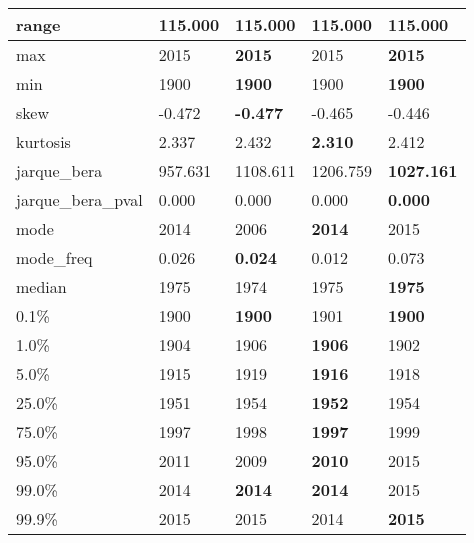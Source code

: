 \begin{table}[H]
\begin{tabular}{|l|m{10em}|m{10em}|m{10em}|m{10em}|}
\hline range & 115.000 & 115.000 & 115.000 & 115.000 \\
\hline max & 2015 & \bfseries 2015 & \cellcolor[rgb]{0.9, 0.54, 0.52} 2015 & \bfseries 2015 \\
\hline min & 1900 & \bfseries 1900 & \cellcolor[rgb]{0.9, 0.54, 0.52} 1900 & \bfseries 1900 \\
\hline skew & -0.472 & \bfseries -0.477 & -0.465 & \cellcolor[rgb]{0.9, 0.54, 0.52} -0.446 \\
\hline kurtosis & 2.337 & \cellcolor[rgb]{0.9, 0.54, 0.52} 2.432 & \bfseries 2.310 & 2.412 \\
\hline jarque\_bera & 957.631 & 1108.611 & \cellcolor[rgb]{0.9, 0.54, 0.52} 1206.759 & \bfseries 1027.161 \\
\hline jarque\_bera\_pval & 0.000 & \cellcolor[rgb]{0.9, 0.54, 0.52} 0.000 & \cellcolor[rgb]{0.9, 0.54, 0.52} 0.000 & \bfseries 0.000 \\
\hline mode & 2014 & \cellcolor[rgb]{0.9, 0.54, 0.52} 2006 & \bfseries 2014 & 2015 \\
\hline mode\_freq & 0.026 & \bfseries 0.024 & 0.012 & \cellcolor[rgb]{0.9, 0.54, 0.52} 0.073 \\
\hline median & 1975 & \cellcolor[rgb]{0.9, 0.54, 0.52} 1974 & 1975 & \bfseries 1975 \\
\hline 0.1\% & 1900 & \bfseries 1900 & \cellcolor[rgb]{0.9, 0.54, 0.52} 1901 & \bfseries 1900 \\
\hline 1.0\% & 1904 & \cellcolor[rgb]{0.9, 0.54, 0.52} 1906 & \bfseries 1906 & \cellcolor[rgb]{0.9, 0.54, 0.52} 1902 \\
\hline 5.0\% & 1915 & \cellcolor[rgb]{0.9, 0.54, 0.52} 1919 & \bfseries 1916 & 1918 \\
\hline 25.0\% & 1951 & \cellcolor[rgb]{0.9, 0.54, 0.52} 1954 & \bfseries 1952 & \cellcolor[rgb]{0.9, 0.54, 0.52} 1954 \\
\hline 75.0\% & 1997 & 1998 & \bfseries 1997 & \cellcolor[rgb]{0.9, 0.54, 0.52} 1999 \\
\hline 95.0\% & 2011 & 2009 & \bfseries 2010 & \cellcolor[rgb]{0.9, 0.54, 0.52} 2015 \\
\hline 99.0\% & 2014 & \bfseries 2014 & \bfseries 2014 & \cellcolor[rgb]{0.9, 0.54, 0.52} 2015 \\
\hline 99.9\% & 2015 & 2015 & \cellcolor[rgb]{0.9, 0.54, 0.52} 2014 & \bfseries 2015 \\
\hline
\end{tabular}
\end{table}
